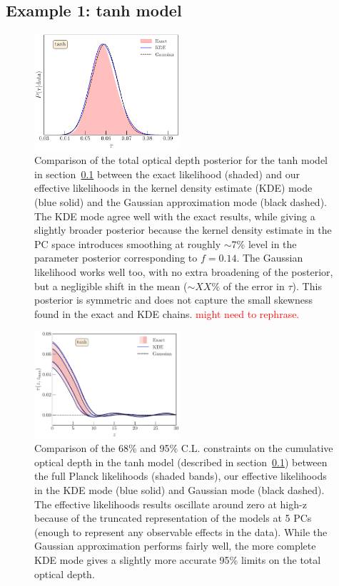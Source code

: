 \documentclass[prd,twocolumn,amsmath,amssymb,floatfix,superscriptaddress,nofootinbib]{revtex4-1}
\newcommand{\refsec}[1]{section~\ref{sec:#1}}
\newcommand{\ch}[1]{\textcolor{red}{#1}}
\begin{document}
\subsection{Example 1: tanh model}
\label{sec:example1}

\begin{figure}
\includegraphics[width=0.48\textwidth]
{paper/plots/pl18_tau_posterior_tanh_vs_tanh_kde_vs_tanh_gaussian_dz_auto_zre_prior_6p1_normalized_by_max.pdf}
\caption{Comparison of the total optical depth posterior for the tanh model in \refsec{example1} between the exact likelihood (shaded) and our effective likelihoods in the kernel density estimate (KDE) mode (blue solid) and the Gaussian approximation mode (black dashed). The KDE mode agree well with the exact results, while giving a slightly broader posterior because the kernel density estimate in the PC space introduces smoothing at roughly $\sim$7\% level in the parameter posterior corresponding to $f = 0.14$. The Gaussian likelihood works well too, with no extra broadening of the posterior, but a negligible shift in the mean ($\sim XX\%$ of the error in $\tau$). This posterior is symmetric and does not capture the small skewness found in the exact and KDE chains. \ch{might need to rephrase.} 
}
\label{fig:tanh}

\end{figure}


\begin{figure}[ht]
\includegraphics[width=0.48\textwidth]{paper/plots/pl18_taugtz_tanh_direct_vs_kde_vs_gaussian.pdf}
\caption{Comparison of the 68\% and 95\% C.L. constraints on the cumulative optical depth in the tanh model (described in \refsec{example1}) between the full Planck likelihoods (shaded bands), our effective likelihoods in the KDE mode (blue solid) and Gaussian mode (black dashed). The effective likelihoods results oscillate around zero at high-z because of the truncated representation of the models at 5 PCs (enough to represent any observable effects in the data). While the Gaussian approximation performs fairly well, the more complete KDE mode gives a slightly more accurate 95\% limits on the total optical depth. }
\label{fig:plot_taugtz_PC_vs_tanh}
\end{figure}
\end{document}
